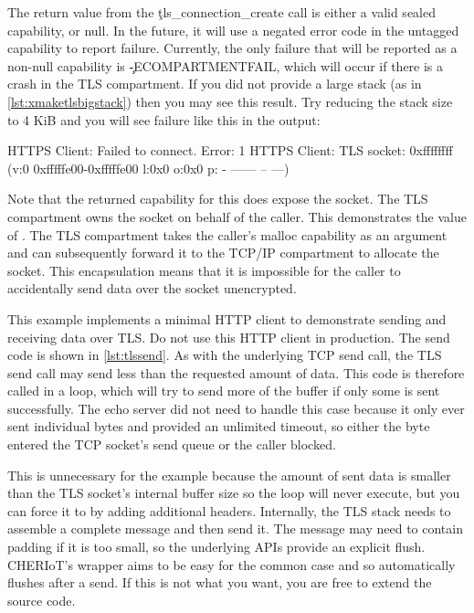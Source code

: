{\codelisting[filename=examples/tls/https.cc,marker=tls_connect,label=lst:tlsconnect,caption="Connecting to a remote server with TLS."]{}

The return value from the \c{tls_connection_create} call is either a valid sealed capability, or null.
In the future, it will use a negated error code in the untagged capability to report failure.
Currently, the only failure that will be reported as a non-null capability is \c{-ECOMPARTMENTFAIL}, which will occur if there is a crash in the TLS compartment.
If you did not provide a large stack (as in \ref{lst:xmaketlsbigstack}) then you may see this result.
Try reducing the stack size to 4 KiB and you will see failure like this in the output:

\begin{console}
HTTPS Client: Failed to connect.  Error: 1
HTTPS Client: TLS socket: 0xffffffff (v:0 0xfffffe00-0xfffffe00 l:0x0 o:0x0 p: - ------ -- ---)
\end{console}

Note that the returned capability for this does  expose the socket.
The TLS compartment owns the socket on behalf of the caller.
This demonstrates the value of .
The TLS compartment takes the caller's malloc capability as an argument and can subsequently forward it to the TCP/IP compartment to allocate the socket.
This encapsulation means that it is impossible for the caller to accidentally send data over the socket unencrypted.

This example implements a minimal HTTP client to demonstrate sending and receiving data over TLS.
Do not use this HTTP client in production.
The send code is shown in \ref{lst:tlssend}.
As with the underlying TCP send call, the TLS send call may send less than the requested amount of data.
This code is therefore called in a loop, which will try to send more of the buffer if only some is sent successfully.
The echo server did not need to handle this case because it only ever sent individual bytes and provided an unlimited timeout, so either the byte entered the TCP socket's send queue or the caller blocked.

This is unnecessary for the example because the amount of sent data is smaller than the TLS socket's internal buffer size so the loop will never execute, but you can force it to by adding additional headers.
Internally, the TLS stack needs to assemble a complete message and then send it.
The message may need to contain padding if it is too small, so the underlying APIs provide an explicit flush.
CHERIoT's wrapper aims to be easy for the common case and so automatically flushes after a send.
If this is not what you want, you are free to extend the source code.

}
